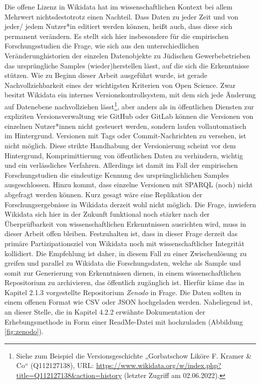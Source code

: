 Die offene Lizenz in Wikidata hat im wissenschaftlichen Kontext bei allem Mehrwert nichtsdestotrotz einen Nachteil. Dass Daten zu jeder Zeit und von jeder/ jedem Nutzer*in editiert werden können, heißt auch, dass diese sich permanent verändern. Es stellt sich hier insbesondere für die empirischen Forschungsstudien die Frage, wie sich aus den unterschiedlichen Veränderunghistorien der einzelen Datenobjekte zu Jüdischen Gewerbebetrieben das ursprüngliche Samples (wieder)herstellen lässt, auf die sich die Erkenntnisse stützen. Wie zu Beginn dieser Arbeit ausgeführt wurde, ist gerade Nachvollziehbarkeit eines der wichtigsten Kriterien von Open Science. Zwar besitzt Wikidata ein internes Versionskontrollsystem, mit dem sich jede Änderung auf Datenebene nachvollziehen lässt\footnote{Siehe zum Beispiel die Versionsgeschichte „Gorbatschow Liköre F. Kramer \& Co“ (Q112127138), URL: \url{https://www.wikidata.org/w/index.php?title=Q112127138&action=history} (letzter Zugriff am 02.06.2022).}, aber anders als in öffentlichen Diensten zur expliziten Versionsverwaltung wie GitHub oder GitLab können die Versionen von einzelnen Nutzer*innen nicht gesteuert werden, sondern laufen vollautomatisch im Hintergrund. Versionen mit Tags oder Commit-Nachrichten zu versehen, ist nicht möglich. Diese strikte Handhabung der Versionierung scheint vor dem Hintergrund, Komprimittierung von öffentlichen Daten zu verhindern, wichtig und ein verlässliches Verfahren. Allerdings ist damit im Fall der empirischen Forschungstudien die eindeutige Kennung des ursprünglichlichen Samples ausgeschlossen. Hinzu kommt, dass einzelne Versionen mit SPARQL (noch) nicht abgefragt werden können. Kurz gesagt wäre eine Replikation der Forschungsergebnisse in Wikidata derzeit wohl nicht möglich. Die Frage, inwiefern Wikidata sich hier in der Zukunft funktional noch stärker nach der Überprüfbarkeit von wissenschaftlichen Erkenntnissen ausrichten wird, muss in dieser Arbeit offen bleiben. Festzuhalten ist, dass in dieser Frage derzeit das primäre Partizipationsziel von Wikidata noch mit wissenschaftlicher Integrität kollidiert. Die Empfehlung ist daher, in diesem Fall zu einer Zwischenlösung zu greifen und parallel zu Wikidata die Forschungsdaten, welche als Sample und somit zur Generierung von Erkenntnissen dienen, in einem wissenschaftlichen Repositorium zu archivieren, das öffentlich zugänglich ist. Hierfür käme das in Kapitel 2.1.3 vorgestellte Repositorium \textit{Zenodo} in Frage. Die Daten sollten in einem offenen Format wie CSV oder JSON hochgeladen werden. Naheliegend ist, an dieser Stelle, die in Kapitel 4.2.2 erwähnte Dokumentation der Erhebungsmethode in Form einer ReadMe-Datei mit hochzuladen (Abbildung \ref{fig:zenodo}).

